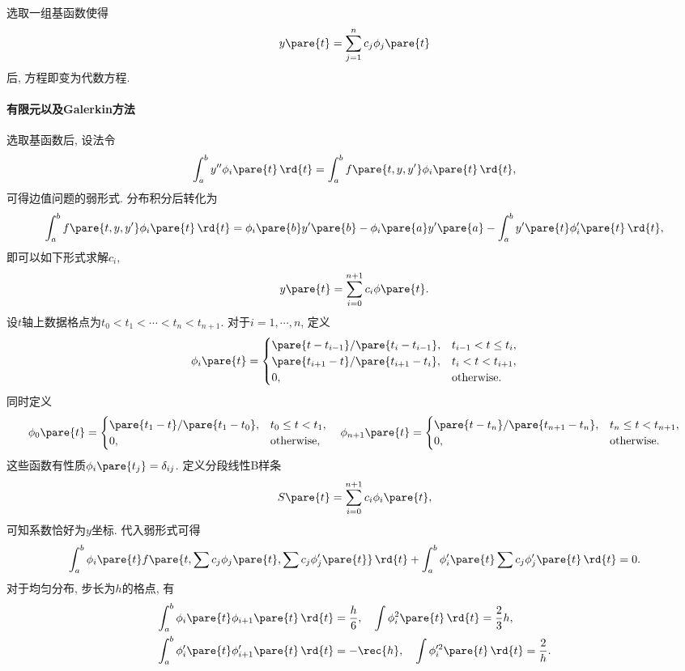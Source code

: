 \documentclass{ctexart}
\begin{document}
选取一组基函数使得
\[ y\pare{t} = \sum_{j=1}^n c_j\phi_j\pare{t} \]
后, 方程即变为代数方程.


\paragraph{有限元以及Galerkin方法} %
\label{par:有限元以及galerkin方法}

选取基函数后, 设法令
\[ \int_a^b y'' \phi_i\pare{t}\,\rd{t} = \int_a^b f\pare{t,y,y'}\phi_i\pare{t}\,\rd{t}, \]
可得边值问题的弱形式. 分布积分后转化为
\[ \int_a^b f\pare{t,y,y'}\phi_i\pare{t}\,\rd{t} = \phi_i\pare{b}y'\pare{b} - \phi_i\pare{a}y'\pare{a} - \int_a^b y'\pare{t}\phi'_i\pare{t}\,\rd{t}, \]
即可以如下形式求解$c_i$,
\[ y\pare{t} = \sum_{i=0}^{n+1} c_i\phi\pare{t}. \]
设$t$轴上数据格点为$t_0 < t_1 < \cdots < t_n < t_{n+1}$. 对于$i = 1,\cdots,n$, 定义
\[ \phi_i\pare{t} = \begin{cases}
    \pare{t - t_{i-1}} / \pare{t_i - t_{i-1}}, & t_{i-1} < t \le t_i, \\
    \pare{t_{i+1} - t} / \pare{t_{i+1} - t_i}, & t_i < t < t_{i+1}, \\
    0, & \mathrm{otherwise}.
\end{cases} \]
同时定义
\[ \phi_0\pare{t} = \begin{cases}
    \pare{t_1 - t} / \pare{t_1 - t_{0}}, & t_{0} \le t < t_1, \\
    0, & \mathrm{otherwise},
\end{cases}\quad \phi_{n+1}\pare{t} = \begin{cases}
    \pare{t - t_n} / \pare{t_{n+1} - t_{n}}, & t_{n} \le t < t_{n+1}, \\
    0, & \mathrm{otherwise}.
\end{cases} \]
这些函数有性质$\phi_i\pare{t_j} = \delta_{ij}$. 定义分段线性B样条
\[ S\pare{t} = \sum_{i=0}^{n+1} c_i\phi_i\pare{t}, \]
可知系数恰好为$y$坐标. 代入弱形式可得
\[ \int_a^b \phi_i\pare{t} f\pare{t,\sum c_j \phi_j\pare{t}, \sum c_j\phi'_j\pare{t}}\,\rd{t} + \int_a^b \phi'_i\pare{t} \sum c_j\phi'_j\pare{t}\,\rd{t} = 0. \]
对于均匀分布, 步长为$h$的格点, 有
\begin{align*}
    \int_a^b \phi_i\pare{t}\phi_{i+1}\pare{t}\,\rd{t} &= \frac{h}{6},\quad \int \phi_i^2\pare{t}\,\rd{t} = \frac{2}{3}h, \\
    \int_a^b \phi'_i\pare{t}\phi'_{i+1}\pare{t}\,\rd{t} &= -\rec{h},\quad \int \phi_i'^2\pare{t}\,\rd{t} = \frac{2}{h}.
\end{align*}




\end{document}
